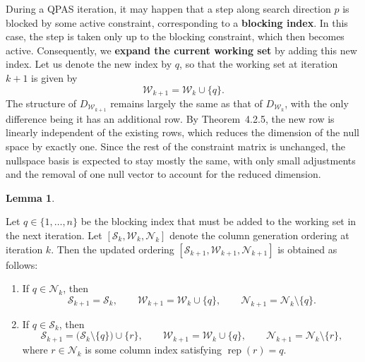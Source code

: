 \documentclass{book}
\theoremstyle{definition}
\newtheorem{lemma}[theorem]{Lemma}
\numberwithin{algorithm_}{chapter}
\begin{document}
{During a QPAS iteration, it may happen that a step along search direction $p$ is blocked by some active constraint, corresponding to a \textbf{blocking index}. In this case, the step is taken only up to the blocking constraint, which then becomes active. Consequently, we \textbf{expand the current working set} by adding this new index. Let us denote the new index by $q$, so that the working set at iteration $k+1$ is given by
\begin{equation}
\mathcal{W}_{k+1} = \mathcal{W}_k \cup \{q\}.
\end{equation}
The structure of $D_{\mathcal{W}_{k+1}}$ remains largely the same as that of $D_{\mathcal{W}_k}$, with the only difference being it has an additional row. By Theorem~4.2.5, the new row is linearly independent of the existing rows, which reduces the dimension of the null space by exactly one. Since the rest of the constraint matrix is unchanged, the nullspace basis is expected to stay mostly the same, with only small adjustments and the removal of one null vector to account for the reduced dimension.

\medskip

\begin{lemma}
\label{lem:update-CGordering}

Let \(q \in \{1, \ldots, n\}\) be the blocking index that must be added to the working set in the next iteration.
Let \([\mathcal{S}_k, \mathcal{W}_k, \mathcal{N}_k]\) denote the column generation ordering at iteration \(k\).
Then the updated ordering \([\mathcal{S}_{k+1}, \mathcal{W}_{k+1}, \mathcal{N}_{k+1}]\) is obtained as follows:

\begin{enumerate}
    \item If \(q \in \mathcal{N}_k\), then
    \[
    \mathcal{S}_{k+1} = \mathcal{S}_k, 
    \qquad
    \mathcal{W}_{k+1} = \mathcal{W}_k \cup \{q\}, 
    \qquad
    \mathcal{N}_{k+1} = \mathcal{N}_k \setminus \{q\}.
    \]

    \item If \(q \in \mathcal{S}_k\), then
    \[
    \mathcal{S}_{k+1} 
    = 
    \bigl(\mathcal{S}_k \setminus \{q\}\bigr) \cup \{r\},
    \qquad
    \mathcal{W}_{k+1} 
    = 
    \mathcal{W}_k \cup \{q\},
    \qquad
    \mathcal{N}_{k+1} 
    = 
    \mathcal{N}_k \setminus \{r\},
    \]
    where \(r \in \mathcal{N}_k\) is some column index satisfying $\operatorname{rep}(r) = q$.

\end{enumerate}


\end{lemma}}
\end{document}
